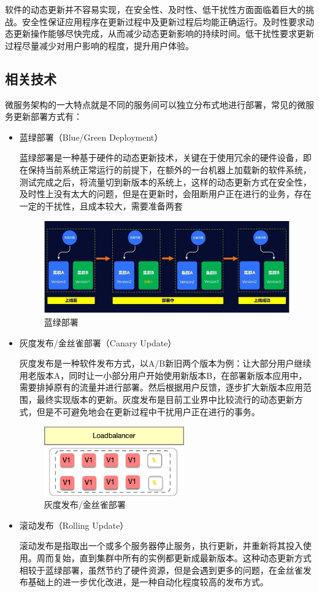 \documentclass[12pt,a4paper]{article}
\theoremstyle{definition}
\begin{document}
软件的动态更新并不容易实现，在安全性、及时性、低干扰性方面面临着巨大的挑战。安全性保证应用程序在更新过程中及更新过程后均能正确运行。及时性要求动态更新操作能够尽快完成，从而减少动态更新影响的持续时间。低干扰性要求更新过程尽量减少对用户影响的程度，提升用户体验。

\subsection{相关技术}
微服务架构的一大特点就是不同的服务间可以独立分布式地进行部署，常见的微服务更新部署方式有：
\begin{itemize}
	\item{蓝绿部署（Blue/Green Deployment）

	蓝绿部署是一种基于硬件的动态更新技术，关键在于使用冗余的硬件设备，即在保持当前系统正常运行的前提下，在额外的一台机器上加载新的软件系统，测试完成之后，将流量切到新版本的系统上，这样的动态更新方式在安全性，及时性上没有太大的问题，但是在更新时，会阻断用户正在进行的业务，存在一定的干扰性，且成本较大，需要准备两套}
	\begin{figure}[ht]
	 \centering
	 \includegraphics[height=4cm]{images/blue-green.jpeg}
	 \caption{蓝绿部署}
	 \label{fig:blue-green}
	\end{figure}

	\item{灰度发布/金丝雀部署（Canary Update）

	灰度发布是一种软件发布方式，以A/B新旧两个版本为例：让大部分用户继续用老版本A，同时让一小部分用户开始使用新版本B，在部署新版本应用中，需要排掉原有的流量并进行部署。然后根据用户反馈，逐步扩大新版本应用范围，最终实现版本的更新。灰度发布是目前工业界中比较流行的动态更新方式，但是不可避免地会在更新过程中干扰用户正在进行的事务。}
	\begin{figure}[ht]
	 \centering
	 \includegraphics[height=3cm]{images/canary.png}
	 \caption{灰度发布/金丝雀部署}
	 \label{fig:canary}
	\end{figure}

	\item{滚动发布（Rolling Update）

	滚动发布是指取出一个或多个服务器停止服务，执行更新，并重新将其投入使用。周而复始，直到集群中所有的实例都更新成最新版本。这种动态更新方式相较于蓝绿部署，虽然节约了硬件资源，但是会遇到更多的问题，在金丝雀发布基础上的进一步优化改进，是一种自动化程度较高的发布方式。}
	
\end{itemize}
\end{document}
